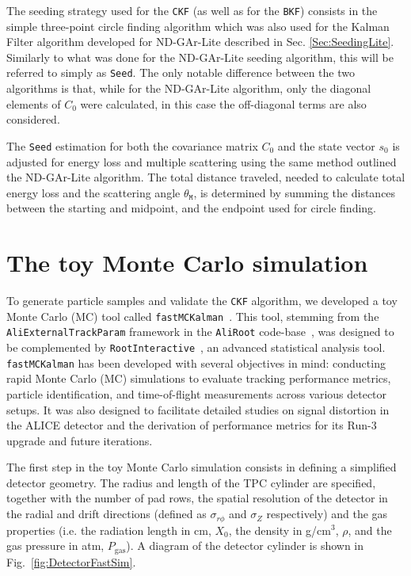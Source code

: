The seeding strategy used for the \texttt{CKF} (as well as for the \texttt{BKF}) consists in the simple three-point circle finding algorithm which was also used for the Kalman Filter algorithm developed for ND-GAr-Lite described in Sec. \ref{Sec:SeedingLite}. Similarly to what was done for the ND-GAr-Lite seeding algorithm, this will be referred to simply as \texttt{Seed}. The only notable difference between the two algorithms is that, while for the ND-GAr-Lite algorithm, only the diagonal elements of $C_0$ were calculated, in this case the off-diagonal terms are also considered. 

The \texttt{Seed} estimation for both the covariance matrix $C_0$ and the state vector $s_0$ is adjusted for energy loss and multiple scattering using the same method outlined the ND-GAr-Lite algorithm. The total distance traveled, needed to calculate total energy loss and the scattering angle $\theta_\texttt{M}$, is determined by summing the distances between the starting and midpoint, and the endpoint used for circle finding.

\section{The toy Monte Carlo simulation}
\label{sec:fastMCKalman}

To generate particle samples and validate the \texttt{CKF} algorithm, we developed a toy Monte Carlo (MC) tool called \texttt{fastMCKalman}~\cite{fastMCKalman}. This tool, stemming from the \texttt{AliExternalTrackParam} framework in the \texttt{AliRoot} code-base~\cite{aliroot}, was designed to be complemented by \texttt{RootInteractive}~\cite{RootInt}, an advanced statistical analysis tool. \texttt{fastMCKalman} has been developed with several objectives in mind: conducting rapid Monte Carlo (MC) simulations to evaluate tracking performance metrics, particle identification, and time-of-flight measurements across various detector setups. It was also designed to facilitate detailed studies on signal distortion in the ALICE detector and the derivation of performance metrics for its Run-3 upgrade and future iterations. 

The first step in the toy Monte Carlo simulation consists in defining a simplified detector geometry. The radius and length of the TPC cylinder are specified, together with the number of pad rows, the spatial resolution of the detector in the radial and drift directions (defined as $\sigma_{r\phi}$ and $\sigma_Z$ respectively) and the gas properties (i.e. the radiation length in cm, $X_0$, the density in g/cm$^3$, $\rho$, and the gas pressure in atm, $P_\textrm{gas}$). A diagram of the detector cylinder is shown in Fig.~\ref{fig:DetectorFastSim}. 

